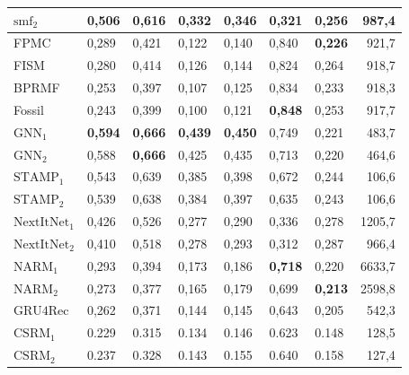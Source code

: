 \begin{table}[htbp]
\begin{tabular}{|l|l|l|l|l|l|l|r|}
    \hline
    $\text{smf}_2$ & 0,506 & 0,616 & 0,332 & 0,346 & 0,321 & 0,256 & 987,4 \\
    \hline
    FPMC & 0,289 & 0,421 & 0,122 & 0,140 & 0,840 & \textbf{0,226} & 921,7 \\
    \hline
    FISM & 0,280 & 0,414 & 0,126 & 0,144 & 0,824 & 0,264 & 918,7 \\
    \hline
    BPRMF & 0,253 & 0,397 & 0,107 & 0,125 & 0,834 & 0,233 & 918,3 \\
    \hline
    Fossil & 0,243 & 0,399 & 0,100 & 0,121 & \textbf{0,848} & 0,253 & 917,7 \\
    \hline
    \hline
    $\text{GNN}_1$ & \textbf{0,594} & \textbf{0,666} & \textbf{0,439} & \textbf{0,450} & 0,749 & 0,221 & 483,7 \\
    \hline
    $\text{GNN}_2$ & 0,588 & \textbf{0,666} & 0,425 & 0,435 & 0,713 & 0,220 & 464,6 \\
    \hline
    $\text{STAMP}_1$ & 0,543 & 0,639 & 0,385 & 0,398 & 0,672 & 0,244 & 106,6 \\
    \hline
    $\text{STAMP}_2$ & 0,539 & 0,638 & 0,384 & 0,397 & 0,635 & 0,243 & 106,6 \\
    \hline  
    $\text{NextItNet}_1$ & 0,426 & 0,526 & 0,277 & 0,290 & 0,336 & 0,278 & 1205,7 \\
    \hline
    $\text{NextItNet}_2$ & 0,410 & 0,518 & 0,278 & 0,293 & 0,312 & 0,287 & 966,4 \\
    \hline
    $\text{NARM}_1$ & 0,293 & 0,394 & 0,173 & 0,186 & \textbf{0,718} & 0,220 & 6633,7 \\
    \hline
    $\text{NARM}_2$ &  0,273 & 0,377 & 0,165 & 0,179 & 0,699 & \textbf{0,213} & 2598,8 \\
    \hline
    $\text{GRU4Rec}$ & 0,262 & 0,371 & 0,144 & 0,145 & 0,643 & 0,205 & 542,3 \\
    \hline
    $\text{CSRM}_1$ & 0.229 & 0.315 & 0.134 & 0.146 & 0.623 & 0.148 &  128,5 \\
    \hline
    $\text{CSRM}_2$ & 0.237 & 0.328 & 0.143 & 0.155 & 0.640 & 0.158 & 127,4 \\
    \hline
  

\end{tabular}
\end{table}

